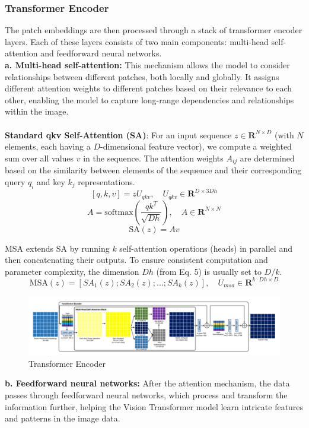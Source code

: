 \subsubsection{Transformer Encoder}
The patch embeddings are then processed through a stack of transformer encoder layers. Each of these layers consists of two main components: multi-head self-attention and feedforward neural networks.
\\


\noindent \textbf{a. Multi-head self-attention:} This mechanism allows the model to consider relationships between different patches, both locally and globally. It assigns different attention weights to different patches based on their relevance to each other, enabling the model to capture long-range dependencies and relationships within the image. \\
\\
\noindent \textbf{Standard qkv Self-Attention (SA)}:
For an input sequence $z \in \mathbf{R}^{N \times D}$ (with $N$ elements, each having a $D$-dimensional feature vector), we compute a weighted sum over all values $v$ in the sequence. The attention weights $A_{ij}$ are determined based on the similarity between elements of the sequence and their corresponding query $q_i$ and key $k_j$ representations.
\[
    [q, k, v] = zU_{qkv}, \quad U_{qkv} \in \mathbf{R}^{D \times 3Dh}
\]
\[
    A = \text{softmax}\left(\frac{qk^T}{\sqrt{Dh}}\right), \quad A \in \mathbf{R}^{N \times N}
\]
\[
    \text{SA}(z) = Av
\]

MSA extends SA by running $k$ self-attention operations (heads) in parallel and then concatenating their outputs. To ensure consistent computation and parameter complexity, the dimension $Dh$ (from Eq. 5) is usually set to $D/k$.
\[
    \text{MSA}(z) = [SA_1(z); SA_2(z); \ldots ; SA_k(z)], \quad U_{msa} \in \mathbf{R}^{k \cdot Dh \times D}
\]
\begin{figure}[htbp]
    \centering
    \includegraphics[width=6in]{img/encoderdetails.jpg}
    \caption{Transformer Encoder}
\end{figure}

\noindent \textbf{b. Feedforward neural networks:} After the attention mechanism, the data passes through feedforward neural networks, which process and transform the information further, helping the Vision Transformer model learn intricate features and patterns in the image data.

